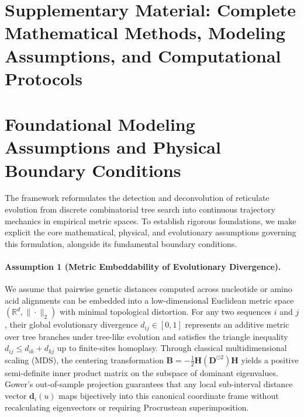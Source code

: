 \section*{Supplementary Material: Complete Mathematical Methods, Modeling Assumptions, and Computational Protocols}

\renewcommand{\thetable}{S\arabic{table}}
\renewcommand{\thefigure}{S\arabic{figure}}
\renewcommand{\theequation}{S\arabic{equation}}
\renewcommand{\thesection}{S\arabic{section}}
\renewcommand{\theHtable}{supp.table.\arabic{table}}
\renewcommand{\theHfigure}{supp.figure.\arabic{figure}}
\renewcommand{\theHequation}{supp.equation.\arabic{equation}}
\renewcommand{\theHsection}{supp.section.\arabic{section}}
\renewcommand{\theHsubsection}{supp.subsection.\arabic{section}.\arabic{subsection}}
\setcounter{table}{0}
\setcounter{figure}{0}
\setcounter{equation}{0}
\setcounter{section}{0}

\section{Foundational Modeling Assumptions and Physical Boundary Conditions}
\label{supp:assumptions}

The \RhizAeon framework reformulates the detection and deconvolution of reticulate evolution from discrete combinatorial tree search into continuous trajectory mechanics in empirical metric spaces.
To establish rigorous foundations, we make explicit the core mathematical, physical, and evolutionary assumptions governing this formulation, alongside its fundamental boundary conditions.

\paragraph{Assumption 1 (Metric Embeddability of Evolutionary Divergence).}
We assume that pairwise genetic distances computed across nucleotide or amino acid alignments can be embedded into a low-dimensional Euclidean metric space $(\mathbb{R}^d, \|\cdot\|_2)$ with minimal topological distortion.
For any two sequences $i$ and $j$, their global evolutionary divergence $d_{ij} \in [0, 1]$ represents an additive metric over tree branches under tree-like evolution and satisfies the triangle inequality $d_{ij} \le d_{ik} + d_{kj}$ up to finite-sites homoplasy.
Through classical multidimensional scaling (MDS), the centering transformation $\mathbf{B} = -\frac{1}{2}\mathbf{H}(\mathbf{D}^{\odot 2})\mathbf{H}$ yields a positive semi-definite inner product matrix on the subspace of dominant eigenvalues.
Gower's out-of-sample projection guarantees that any local sub-interval distance vector $\mathbf{d}_i(u)$ maps bijectively into this canonical coordinate frame without recalculating eigenvectors or requiring Procrustean superimposition.

